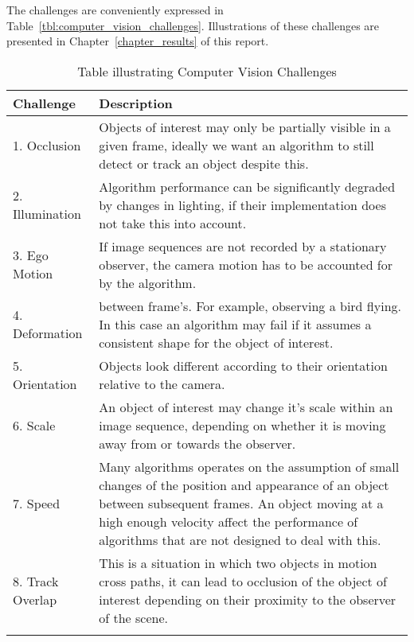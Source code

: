 The challenges are conveniently expressed in
Table~\ref{tbl:computer_vision_challenges}. Illustrations of these challenges
are presented in Chapter~\ref{chapter_results} of this report.

\newpage
\begin{longtable}{p{5cm}  p{8cm}}
    \hline
    \textbf{Challenge} & \textbf{Description} \\ 
    \hline\hline
    
    1. Occlusion
    & 
    Objects of interest may only be partially visible in a
    given frame, ideally we want an algorithm to still detect or
    track an object despite this.
    \\ \bottomrule
    
    2. Illumination
    &
    Algorithm performance can be significantly degraded by changes
    in lighting, if their implementation does not take this into
    account.
    \\ \bottomrule
    
    3. Ego Motion
    &
    If image sequences are not recorded by a stationary observer,
    the camera motion has to be accounted for by the algorithm.
    \\ \bottomrule
    
    4. Deformation
    &
    between frame's. For example, observing a bird flying. In this
    case an algorithm may fail if it assumes a consistent shape for
    the object of interest.
    \\ \bottomrule

    5. Orientation
    &
    Objects look different according to their orientation relative
    to the camera.
    \\ \bottomrule

    6. Scale
    &
    An object of interest may change it's scale within an image
    sequence, depending on whether it is moving away from or towards
    the observer.
    \\ \bottomrule

    7. Speed 
    &
    Many algorithms operates on the assumption of small
    changes of the position and appearance of an object between
    subsequent frames. An object moving at a high enough velocity
    affect the performance of algorithms that are not designed to
    deal with this.
    \\ \bottomrule
  
    8. Track Overlap
    &
    This is a situation in which two objects in motion cross paths, it can lead
    to occlusion of the object of interest depending on their proximity to the
    observer of the scene.
    \\ \bottomrule

    \caption{Table illustrating Computer Vision Challenges}
\end{longtable}\label{tbl:computer_vision_challenges}
\newpage

